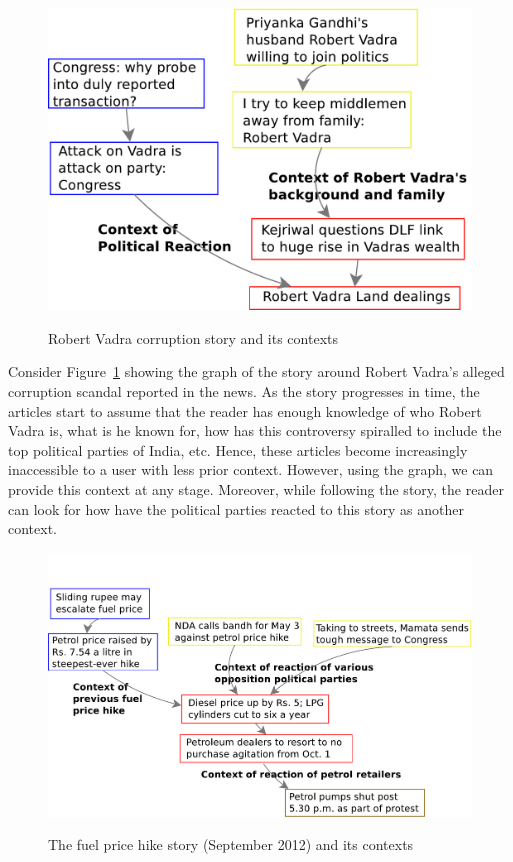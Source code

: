 \begin{figure}

\caption{Robert Vadra corruption story and its contexts}
\includegraphics[scale=0.36]{figures/graph-vadra.pdf}
\label{fig:vadra-corruption}
\end{figure}

Consider Figure~\ref{fig:vadra-corruption} showing the graph of the story around Robert Vadra's alleged
corruption scandal reported in the news. As the story progresses in time, the articles
start to assume that the reader has enough knowledge of who Robert Vadra is, what is he known for,
how has this controversy spiralled to include the top political parties of India, etc. Hence, these articles
become increasingly inaccessible to a user with less prior context. However, 
using the graph, we can provide this context at any stage. Moreover, while following the story, 
the reader can look for how have the political parties reacted to this story as another context.

\begin{figure}
\caption{The fuel price hike story (September 2012) and its contexts}
\includegraphics[scale=0.32]{figures/graph-petrol.pdf}
\label{fig:petrol}
\end{figure}

